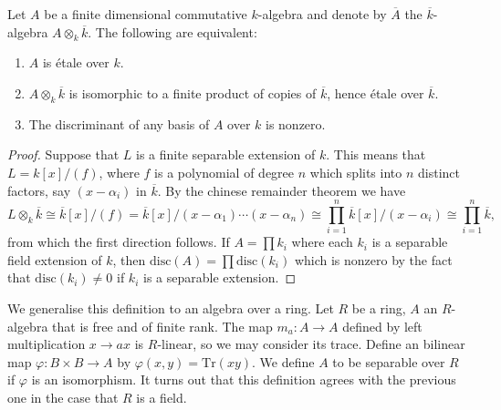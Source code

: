 \begin{theorem}
  Let $A$ be a finite dimensional commutative $k$-algebra and denote by $\overline{A}$ the $\overline{k}$-algebra $A \otimes_k \overline{k}$. The following are equivalent:
  \begin{enumerate}
    \item $A$ is \'etale over $k$.\label{etale}
    \item $A \otimes_k \overline{k}$ is isomorphic to a finite product of copies of $\overline{k}$, hence \'etale over $\overline{k}$.\label{product}
    \item The discriminant of any basis of $A$ over $k$ is nonzero.\label{trace}
  \end{enumerate}
\end{theorem}
\begin{proof}
  Suppose that $L$ is a finite separable extension of $k$. This means that $L = k[x]/(f)$, where $f$ is a polynomial of degree $n$ which splits into $n$ distinct factors, say $(x-\alpha_i)$ in $\overline{k}$. By the chinese remainder theorem we have
  \[L \otimes_k \overline{k} \cong \overline{k}[x]/(f) = \overline{k}[x]/(x-\alpha_1)\cdots(x-\alpha_n) \cong \prod_{i=1}^n \overline{k}[x] / (x-\alpha_i) \cong \prod_{i=1}^n \overline{k},\] from which the first direction follows.
   If $A = \prod k_i$  where each $k_i$ is a separable field extension of $k$, then $\text{disc}(A) = \prod \text{disc}(k_i)$ which is nonzero by the fact that $\text{disc}(k_i) \neq 0$ if $k_i$ is a separable extension.
\end{proof}
We generalise this definition to an algebra over a ring. Let $R$ be a ring, $A$ an $R$-algebra that is free and of finite rank. The map $m_a: A \to A$ defined by left multiplication $x \to ax$ is $R$-linear, so we may consider its trace. Define an bilinear map $\varphi: B \times B \to A$ by $\varphi(x,y) = \text{Tr}(xy)$. We define $A$ to be separable over $R$ if $\varphi$ is an isomorphism. It turns out that this definition agrees with the previous one in the case that $R$ is a field.

